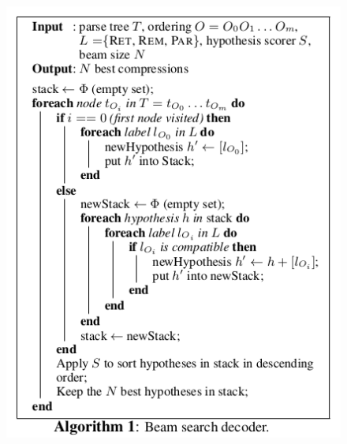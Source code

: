\documentclass[xcolor={table}]{beamer}
\begin{document}
\begin{frame}{\cite{wang2013sentence}}
\begin{figure}[h]
\centering
\includegraphics[scale=.3]{images/algo1-wang13} 
\end{figure}
\end{frame}




\end{document}
